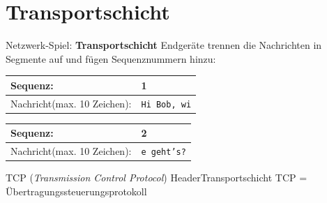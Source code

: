 \section{Transportschicht}

\begin{frame}{Netzwerk-Spiel: \textbf{Transportschicht}}
    Endgeräte trennen die Nachrichten in Segmente auf und fügen Sequenznummern hinzu:
    \begin{table}[H]
        \centering

        \begin{tabular}{p{2cm}l}
            \rowcolor{\transportLayerColor!20}Sequenz:                                    & 1                   \\\midrule
            \rowcolor{\applicationLayerColor!20}Nachricht\newline\tiny (max. 10 Zeichen): & \texttt{Hi Bob, wi} \\
        \end{tabular}
        \begin{tabular}{p{2cm}l}
            \rowcolor{\transportLayerColor!20}Sequenz:                                    & 2                  \\\midrule
            \rowcolor{\applicationLayerColor!20}Nachricht\newline\tiny (max. 10 Zeichen): & \texttt{e geht's?} \\
        \end{tabular}
    \end{table}
\end{frame}

\begin{frame}[fragile]{\faBoxOpen{} \acrshort{TCP} (\textit{Transmission Control Protocol}) Header}{Transportschicht}
    \acrshort{TCP} = Übertragungssteuerungsprotokoll
    \begin{table}[H]
        \centering
        
    \end{table}
\end{frame}

